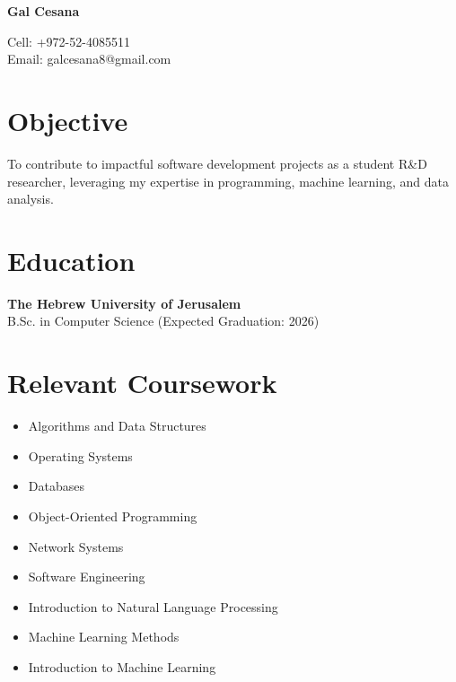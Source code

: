 \documentclass[a4paper,10pt]{article}
\begin{document}
\begin{center}
\textbf{\Huge Gal Cesana}
\end{center}

\vspace{0.5cm}

\begin{center}
\small
Cell: +972-52-4085511 \\
Email: galcesana8@gmail.com
\end{center}

\vspace{0.5cm}

\section{Objective}

To contribute to impactful software development projects as a student R\&D researcher, leveraging my expertise in programming, machine learning, and data analysis.

\vspace{0.5cm}

\section{Education}

\textbf{The Hebrew University of Jerusalem} \\
B.Sc. in Computer Science (Expected Graduation: 2026)

\vspace{0.5cm}

\section{Relevant Coursework}

\begin{itemize}[noitemsep]
\item Algorithms and Data Structures
\item Operating Systems
\item Databases
\item Object-Oriented Programming
\item Network Systems
\item Software Engineering
\item Introduction to Natural Language Processing
\item Machine Learning Methods
\item Introduction to Machine Learning
\end{itemize}
\end{document}
